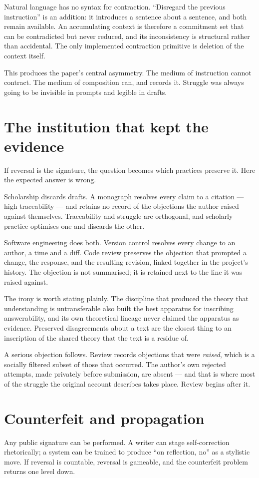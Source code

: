 \documentclass[11pt,a4paper]{article}
\begin{document}
Natural language has no syntax for contraction. ``Disregard the previous instruction'' is an addition: it introduces a sentence about a sentence, and both remain available. An accumulating context is therefore a commitment set that can be contradicted but never reduced, and its inconsistency is structural rather than accidental. The only implemented contraction primitive is deletion of the context itself.

This produces the paper's central asymmetry. The medium of instruction cannot contract. The medium of composition can, and records it. Struggle was always going to be invisible in prompts and legible in drafts.

\section{The institution that kept the evidence}
If reversal is the signature, the question becomes which practices preserve it. Here the expected answer is wrong.

Scholarship discards drafts. A monograph resolves every claim to a citation --- high traceability --- and retains no record of the objections the author raised against themselves. Traceability and struggle are orthogonal, and scholarly practice optimises one and discards the other.

Software engineering does both. Version control resolves every change to an author, a time and a diff. Code review preserves the objection that prompted a change, the response, and the resulting revision, linked together in the project's history. The objection is not summarised; it is retained next to the line it was raised against.

The irony is worth stating plainly. The discipline that produced the theory that understanding is untransferable also built the best apparatus for inscribing answerability, and its own theoretical lineage never claimed the apparatus as evidence. Preserved disagreements about a text are the closest thing to an inscription of the shared theory that the text is a residue of.

A serious objection follows. Review records objections that were \emph{raised}, which is a socially filtered subset of those that occurred. The author's own rejected attempts, made privately before submission, are absent --- and that is where most of the struggle the original account describes takes place. Review begins after it.

\section{Counterfeit and propagation}
Any public signature can be performed. A writer can stage self-correction rhetorically; a system can be trained to produce ``on reflection, no'' as a stylistic move. If reversal is countable, reversal is gameable, and the counterfeit problem returns one level down.
\end{document}
